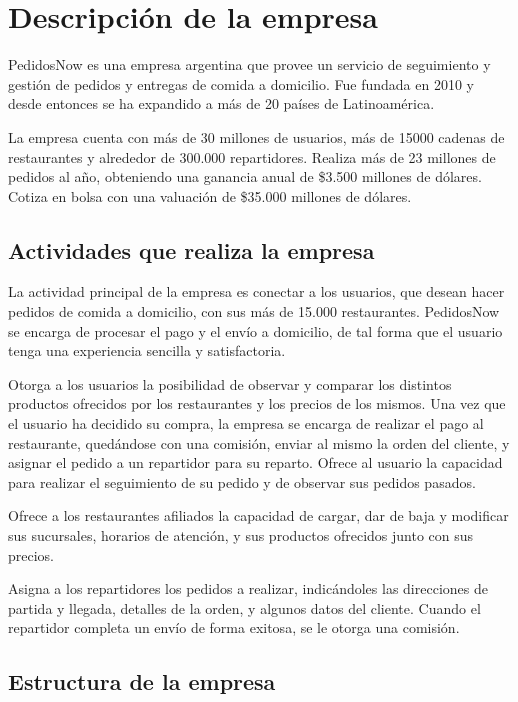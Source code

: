 
\section{Descripción de la empresa}

PedidosNow es una empresa argentina que provee un servicio de seguimiento y gestión de pedidos y entregas de comida a domicilio. Fue fundada en 2010 y desde entonces se ha expandido a más de 20 países de Latinoamérica.

La empresa cuenta con más de 30 millones de usuarios, más de 15000 cadenas de restaurantes y alrededor de 300.000 repartidores. Realiza más de 23 millones de pedidos al año, obteniendo una ganancia anual de \$3.500 millones de dólares. Cotiza en bolsa con una valuación de \$35.000 millones de dólares.

\subsection{Actividades que realiza la empresa}

La actividad principal de la empresa es conectar a los usuarios, que desean hacer pedidos de comida a domicilio, con sus más de 15.000 restaurantes. PedidosNow se encarga de procesar el pago y el envío a domicilio, de tal forma que el usuario tenga una experiencia sencilla y satisfactoria.

Otorga a los usuarios la posibilidad de observar y comparar los distintos productos ofrecidos por los restaurantes y los precios de los mismos. Una vez que el usuario ha decidido su compra, la empresa se encarga de realizar el pago al restaurante, quedándose con una comisión, enviar al mismo la orden del cliente, y asignar el pedido a un repartidor para su reparto. Ofrece al usuario la capacidad para realizar el seguimiento de su pedido y de observar sus pedidos pasados.

Ofrece a los restaurantes afiliados la capacidad de cargar, dar de baja y modificar sus sucursales, horarios de atención, y sus productos ofrecidos junto con sus precios.

Asigna a los repartidores los pedidos a realizar, indicándoles las direcciones de partida y llegada, detalles de la orden, y algunos datos del cliente. Cuando el repartidor completa un envío de forma exitosa, se le otorga una comisión.


\subsection{Estructura de la empresa}

